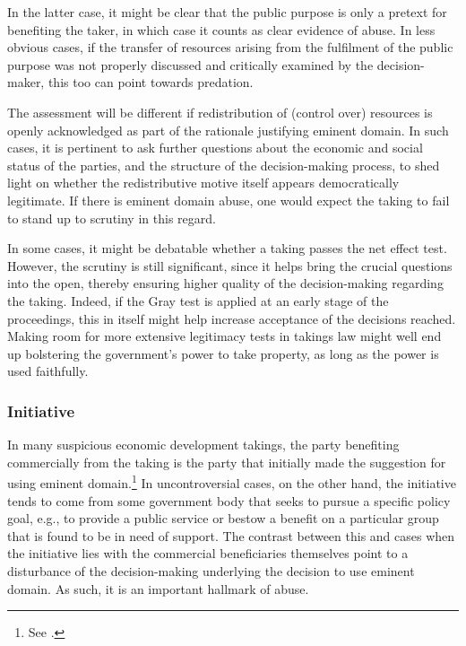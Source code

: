 In the latter case, it might be clear that the public purpose is only a pretext for benefiting the taker, in which case it counts as clear evidence of abuse. In less obvious cases, if the transfer of resources arising from the fulfilment of the public purpose was not properly discussed and critically examined by the decision-maker, this too can point towards predation.

The assessment will be different if redistribution of (control over) resources is openly acknowledged as part of the rationale justifying eminent domain. In such cases, it is pertinent to ask further  questions about the economic and social status of the parties, and the structure of the decision-making process, to shed light on whether the redistributive motive itself appears democratically legitimate. If there is eminent domain abuse, one would expect the taking to fail to stand up to scrutiny in this regard.

In some cases, it might be debatable whether a taking passes the net effect test. However, the scrutiny is still significant, since it helps bring the crucial questions into the open, thereby ensuring higher quality of the decision-making regarding the taking. Indeed, if the Gray test is applied at an early stage of the proceedings, this in itself might help increase acceptance of the decisions reached. Making room for more extensive legitimacy tests in takings law might well end up bolstering the government's power to take property, as long as the power is used faithfully.

\subsubsection*{Initiative}

In many suspicious economic development takings, the party benefiting commercially from the taking is the party that initially made the suggestion for using eminent domain.\footnote{See \cite[32]{gray11}.} In uncontroversial cases, on the other hand, the initiative tends to come from some government body that seeks to pursue a specific policy goal, e.g., to provide a public service or bestow a benefit on a particular group that is found to be in need of support. The contrast between this and cases when the initiative lies with the commercial beneficiaries themselves point to a disturbance of the decision-making underlying the decision to use eminent domain. As such, it is an important hallmark of abuse.

